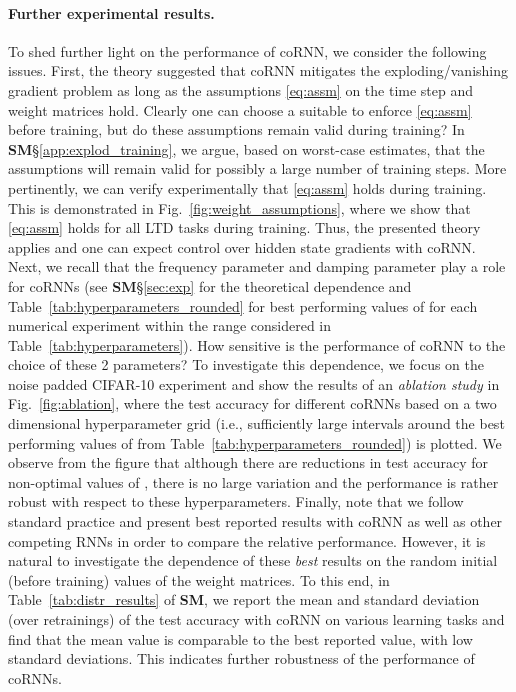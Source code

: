 \documentclass{article} \usepackage{iclr2021_conference,times}
\newcommand{\fref}[1] {Fig.~\ref{#1}}
\newcommand{\Tref}[1]{Table~\ref{#1}}
\begin{document}
\paragraph{Further experimental results.}
To shed further light on the performance of coRNN, we consider the following issues. First, the theory suggested that coRNN mitigates the exploding/vanishing gradient problem as long as the assumptions \eqref{eq:assm} on the time step  and weight matrices  hold. Clearly one can choose a suitable  to enforce \eqref{eq:assm} before training, but do these assumptions remain valid during training? In {\bf SM}\S\ref{app:explod_training}, we argue, based on worst-case estimates, that the assumptions will remain valid for possibly a large number of training steps. More pertinently, we can verify experimentally that \eqref{eq:assm} holds during training. This is demonstrated in \fref{fig:weight_assumptions}, where we show that \eqref{eq:assm} holds for all LTD tasks during training. Thus, the presented theory applies and one can expect control over hidden state gradients with coRNN. Next, we recall that the frequency parameter  and damping parameter  play a role for coRNNs (see {\bf SM}\S\ref{sec:exp} for the theoretical dependence and \Tref{tab:hyperparameters_rounded} for best performing values of  for each numerical experiment within the range considered in \Tref{tab:hyperparameters}). How sensitive is the performance of coRNN to the choice of these 2 parameters? To investigate this dependence, we focus on the noise padded CIFAR-10 experiment and show the results of an \emph{ablation study} in \fref{fig:ablation}, where the test accuracy for different coRNNs based on a two dimensional hyperparameter grid  (i.e., sufficiently large intervals around the best performing values of  from \Tref{tab:hyperparameters_rounded}) is plotted. We observe from the figure that although there are reductions in test accuracy for non-optimal values of , there is no large variation and the performance is rather robust with respect to these hyperparameters. Finally, note that we follow standard practice and present best reported results with coRNN as well as other competing RNNs in order to compare the relative performance. However, it is natural to investigate the dependence of these \emph{best} results on the random initial (before training) values of the weight matrices. To this end, in \Tref{tab:distr_results} of {\bf SM}, we report the mean and standard deviation (over  retrainings) of the test accuracy with coRNN on various learning tasks and find that the mean value is comparable to the best reported value, with low standard deviations. This indicates further robustness of the performance of coRNNs. 
\end{document}
